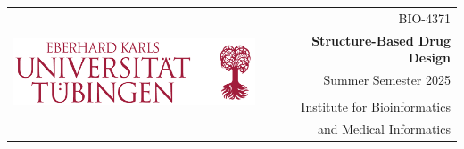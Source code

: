 \selectfont

{
	\small
    \hspace*{-0.3cm}  
    \begin{tabularx}{168mm}{ l X|X r }
        \multirow{7}{*}{\includegraphics[width=9.8cm]{unilogo}} & & & BIO-4371 \\
	    & & & \textcolor{UT_RED}{\textbf{Structure-Based Drug Design}}  \\ [2pt]
        & & & Summer Semester 2025 \\
        & & & \\
        & & & Institute for Bioinformatics \\
        & & & and Medical Informatics \\
    \end{tabularx}
}